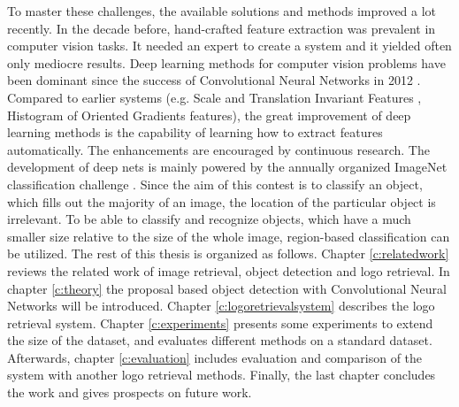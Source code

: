 To master these challenges, the available solutions and methods improved a lot recently. In the decade before, hand-crafted feature extraction was prevalent in computer vision tasks. It needed an expert to create a system and it yielded often only mediocre results. Deep learning methods for computer vision problems have been dominant since the success of Convolutional Neural Networks in 2012 \cite{NIPS2012_4824}. Compared to earlier systems (e.g. Scale and Translation Invariant Features \cite{Lowe:2004:DIF:993451.996342}, Histogram of Oriented Gradients \cite{Dalal:2005:HOG:1068507.1069007} features), the great improvement of deep learning methods is the capability of learning how to extract features automatically. The enhancements are encouraged by continuous research. The development of deep nets is mainly powered by the annually organized ImageNet classification challenge \cite{ILSVRC15}. Since the aim of this contest is to classify an object, which fills out the majority of an image, the location of the particular object is irrelevant. To be able to classify and recognize objects, which have a much smaller size relative to the size of the whole image, region-based classification can be utilized.
\bigbreak
The rest of this thesis is organized as follows. Chapter \ref{c:relatedwork} reviews the related work of image retrieval, object detection and logo retrieval. In chapter \ref{c:theory} the proposal based object detection with Convolutional Neural Networks will be introduced. Chapter \ref{c:logoretrievalsystem} describes the logo retrieval system. Chapter \ref{c:experiments} presents some experiments to extend the size of the dataset, and evaluates different methods on a standard dataset. Afterwards, chapter \ref{c:evaluation} includes evaluation and comparison of the system with another logo retrieval methods. Finally, the last chapter concludes the work and gives prospects on future work.